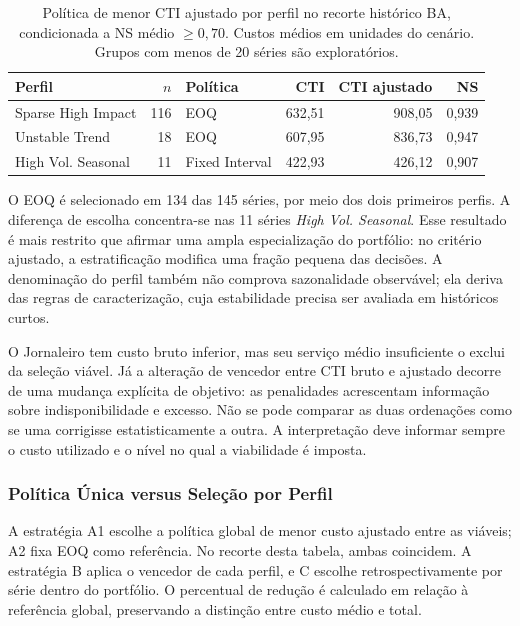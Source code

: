 \begin{table}[ht]
\centering\small
\caption{Política de menor CTI ajustado por perfil no recorte histórico BA, condicionada a NS médio $\geq0{,}70$. Custos médios em unidades do cenário. Grupos com menos de 20 séries são exploratórios.}
\label{tab:dominancia_por_perfil}
\begin{tabular}{@{}lrlrrr@{}}
\toprule
Perfil & $n$ & Política & CTI & CTI ajustado & NS\\
\midrule
Sparse High Impact &116&EOQ&632,51&908,05&0,939\\
Unstable Trend &18&EOQ&607,95&836,73&0,947\\
High Vol. Seasonal &11&Fixed Interval&422,93&426,12&0,907\\
\bottomrule
\end{tabular}
\end{table}

O EOQ é selecionado em 134 das 145 séries, por meio dos dois primeiros perfis. A diferença de escolha concentra-se nas 11 séries \textit{High Vol. Seasonal}. Esse resultado é mais restrito que afirmar uma ampla especialização do portfólio: no critério ajustado, a estratificação modifica uma fração pequena das decisões. A denominação do perfil também não comprova sazonalidade observável; ela deriva das regras de caracterização, cuja estabilidade precisa ser avaliada em históricos curtos.

O Jornaleiro tem custo bruto inferior, mas seu serviço médio insuficiente o exclui da seleção viável. Já a alteração de vencedor entre CTI bruto e ajustado decorre de uma mudança explícita de objetivo: as penalidades acrescentam informação sobre indisponibilidade e excesso. Não se pode comparar as duas ordenações como se uma corrigisse estatisticamente a outra. A interpretação deve informar sempre o custo utilizado e o nível no qual a viabilidade é imposta.

\subsubsection{Política Única versus Seleção por Perfil}
\label{sec:custo_politica_unica_vs_perfil}

A estratégia A1 escolhe a política global de menor custo ajustado entre as viáveis; A2 fixa EOQ como referência. No recorte desta tabela, ambas coincidem. A estratégia B aplica o vencedor de cada perfil, e C escolhe retrospectivamente por série dentro do portfólio. O percentual de redução é calculado em relação à referência global, preservando a distinção entre custo médio e total.

